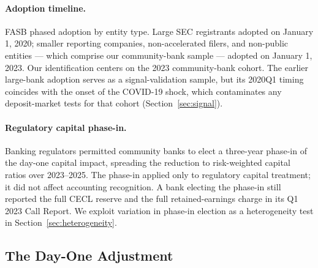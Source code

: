 \paragraph{Adoption timeline.}
FASB phased adoption by entity type. Large SEC registrants adopted on January 1,
2020; smaller reporting companies, non-accelerated filers, and non-public entities
— which comprise our community-bank sample — adopted on January 1, 2023. Our
identification centers on the 2023 community-bank cohort. The earlier large-bank
adoption serves as a signal-validation sample, but its 2020Q1 timing coincides
with the onset of the COVID-19 shock, which contaminates any deposit-market tests
for that cohort (Section~\ref{sec:signal}).

\paragraph{Regulatory capital phase-in.}
Banking regulators permitted community banks to elect a three-year phase-in of
the day-one capital impact, spreading the reduction to risk-weighted capital ratios
over 2023–2025. The phase-in applied only to regulatory capital treatment; it did
not affect accounting recognition. A bank electing the phase-in still reported the
full CECL reserve and the full retained-earnings charge in its Q1 2023 Call
Report. We exploit variation in phase-in election as a heterogeneity test in
Section~\ref{sec:heterogeneity}.

\subsection{The Day-One Adjustment}
\label{sec:background:dayone}

